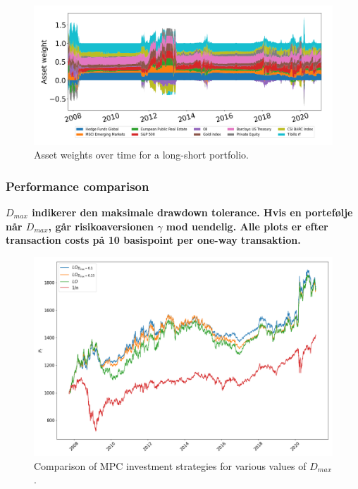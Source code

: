 \begin{figure}[H]
    \centering
    \includegraphics[width=1\textwidth]{analysis/portfolio_exercise/images/mle/weights_ls.png}
    \caption[Asset weights over time for a long-short portfolio]{Asset weights over time for a long-short portfolio.}
    \label{fig:MPC_port_weights_ls}
\end{figure}

\subsubsection*{Performance comparison}

\textbf{$D_{max}$ indikerer den maksimale drawdown tolerance. Hvis en portefølje når $D_{max}$, går risikoaversionen $\gamma$ mod uendelig. Alle plots er efter transaction costs på 10 basispoint per one-way transaktion.}

\begin{figure}[H]
    \centering
    \includegraphics[width=1\textwidth]{analysis/portfolio_exercise/images/mle/port_vals_lo.png}
    \caption[Comparison of MPC investment strategies for various values of $D_{max}$]{Comparison of MPC investment strategies for various values of $D_{max}$.}
    \label{fig:MPC_port_vals_lo}
\end{figure}

